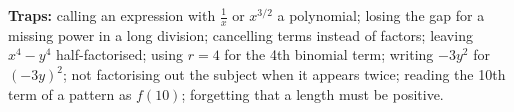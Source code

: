 \documentclass[11pt]{article}
\begin{document}
\textbf{Traps:} calling an expression with $\frac1x$ or $x^{3/2}$ a polynomial; losing the gap for a missing power in a long division; cancelling terms instead of factors; leaving $x^{4}-y^{4}$ half-factorised; using $r=4$ for the 4th binomial term; writing $-3y^{2}$ for $(-3y)^{2}$; not factorising out the subject when it appears twice; reading the 10th term of a pattern as $f(10)$; forgetting that a length must be positive.
\end{document}
